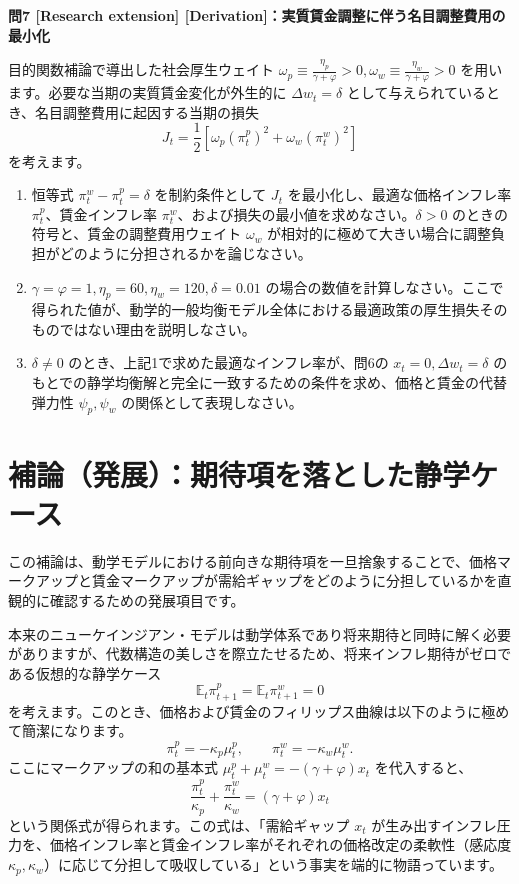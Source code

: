 \documentclass[
  japanese,
  lualatex,
  ja=standard,
  12pt,
  a4paper]{ltjsarticle}
\providecommand{\tightlist}{%
  \setlength{\itemsep}{0pt}\setlength{\parskip}{0pt}}
\begin{document}

\textbf{問7 {[}Research extension{]}
{[}Derivation{]}：実質賃金調整に伴う名目調整費用の最小化}

目的関数補論で導出した社会厚生ウェイト
\(\omega_p \equiv \frac{\eta_p}{\gamma+\varphi}>0, \omega_w \equiv \frac{\eta_w}{\gamma+\varphi}>0\)
を用います。必要な当期の実質賃金変化が外生的に \(\Delta w_t=\delta\)
として与えられているとき、名目調整費用に起因する当期の損失 \[
J_t=\frac12\left[\omega_p(\pi_t^p)^2+\omega_w(\pi_t^w)^2\right]
\] を考えます。

\begin{enumerate}
\def\labelenumi{\arabic{enumi}.}
\tightlist
\item
  恒等式 \(\pi_t^w-\pi_t^p=\delta\) を制約条件として \(J_t\)
  を最小化し、最適な価格インフレ率 \(\pi_t^p\)、賃金インフレ率
  \(\pi_t^w\)、および損失の最小値を求めなさい。\(\delta>0\)
  のときの符号と、賃金の調整費用ウェイト \(\omega_w\)
  が相対的に極めて大きい場合に調整負担がどのように分担されるかを論じなさい。
\item
  \(\gamma=\varphi=1, \eta_p=60, \eta_w=120, \delta=0.01\)
  の場合の数値を計算しなさい。ここで得られた値が、動学的一般均衡モデル全体における最適政策の厚生損失そのものではない理由を説明しなさい。
\item
  \(\delta\ne0\) のとき、上記1で求めた最適なインフレ率が、問6の
  \(x_t=0, \Delta w_t=\delta\)
  のもとでの静学均衡解と完全に一致するための条件を求め、価格と賃金の代替弾力性
  \(\psi_p, \psi_w\) の関係として表現しなさい。
\end{enumerate}

\clearpage

\section{補論（発展）：期待項を落とした静学ケース}\label{ux88dcux8ad6ux767aux5c55ux671fux5f85ux9805ux3092ux843dux3068ux3057ux305fux9759ux5b66ux30b1ux30fcux30b9}

この補論は、動学モデルにおける前向きな期待項を一旦捨象することで、価格マークアップと賃金マークアップが需給ギャップをどのように分担しているかを直観的に確認するための発展項目です。

本来のニューケインジアン・モデルは動学体系であり将来期待と同時に解く必要がありますが、代数構造の美しさを際立たせるため、将来インフレ期待がゼロである仮想的な静学ケース
\[
\mathbb{E}_t\pi_{t+1}^p=\mathbb{E}_t\pi_{t+1}^w=0
\]
を考えます。このとき、価格および賃金のフィリップス曲線は以下のように極めて簡潔になります。
\[
\pi_t^p
=
-\kappa_p\mu_t^p,
\qquad
\pi_t^w
=
-\kappa_w\mu_t^w.
\] ここにマークアップの和の基本式
\(\mu_t^p+\mu_t^w = -(\gamma+\varphi)x_t\) を代入すると、 \[
\frac{\pi_t^p}{\kappa_p}
+
\frac{\pi_t^w}{\kappa_w}
=
(\gamma+\varphi)x_t
\] という関係式が得られます。この式は、「需給ギャップ \(x_t\)
が生み出すインフレ圧力を、価格インフレ率と賃金インフレ率がそれぞれの価格改定の柔軟性（感応度
\(\kappa_p, \kappa_w\)）に応じて分担して吸収している」という事実を端的に物語っています。
\end{document}
